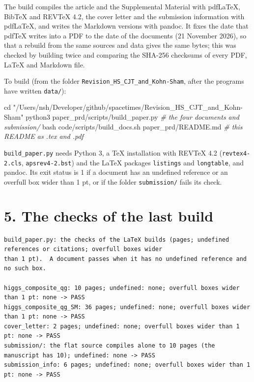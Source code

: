 \documentclass[
  10pt,
]{article}
\newenvironment{Shaded}{}{}
\newcommand{\BuiltInTok}[1]{\textcolor[rgb]{0.00,0.50,0.00}{#1}}
\newcommand{\CommentTok}[1]{\textcolor[rgb]{0.38,0.63,0.69}{\textit{#1}}}
\newcommand{\ExtensionTok}[1]{#1}
\newcommand{\FunctionTok}[1]{\textcolor[rgb]{0.02,0.16,0.49}{#1}}
\newcommand{\NormalTok}[1]{#1}
\newcommand{\StringTok}[1]{\textcolor[rgb]{0.25,0.44,0.63}{#1}}
\begin{document}
The build compiles the article and the Supplemental Material with
pdfLaTeX, BibTeX and REVTeX 4.2, the cover letter and the submission
information with pdfLaTeX, and writes the Markdown versions with pandoc.
It fixes the date that pdfTeX writes into a PDF to the date of the
documents (21 November 2026), so that a rebuild from the same sources
and data gives the same bytes; this was checked by building twice and
comparing the SHA-256 checksums of every PDF, LaTeX and Markdown file.

To build (from the folder \texttt{Revision\_HS\_CJT\_and\_Kohn-Sham},
after the programs have written \texttt{data/}):

\begin{Shaded}
\begin{Highlighting}[]
\BuiltInTok{cd} \StringTok{"/Users/nsh/Developer/github/spacetimes/Revision\_HS\_CJT\_and\_Kohn{-}Sham"}
\ExtensionTok{python3}\NormalTok{ paper\_prd/scripts/build\_paper.py             }\CommentTok{\# the four documents and submission/}
\FunctionTok{bash}\NormalTok{ code/scripts/build\_docs.sh paper\_prd/README.md  }\CommentTok{\# this README as .tex and .pdf}
\end{Highlighting}
\end{Shaded}

\texttt{build\_paper.py} needs Python 3, a TeX installation with REVTeX
4.2 (\texttt{revtex4-2.cls}, \texttt{apsrev4-2.bst}) and the LaTeX
packages \texttt{listings} and \texttt{longtable}, and pandoc. Its exit
status is 1 if a document has an undefined reference or an overfull box
wider than 1 pt, or if the folder \texttt{submission/} fails its check.

\hypertarget{the-checks-of-the-last-build}{%
\section{5. The checks of the last
build}\label{the-checks-of-the-last-build}}

\begin{verbatim}
build_paper.py: the checks of the LaTeX builds (pages; undefined references or citations; overfull boxes wider
than 1 pt).  A document passes when it has no undefined reference and no such box.

higgs_composite_qg: 10 pages; undefined: none; overfull boxes wider than 1 pt: none -> PASS
higgs_composite_qg_SM: 36 pages; undefined: none; overfull boxes wider than 1 pt: none -> PASS
cover_letter: 2 pages; undefined: none; overfull boxes wider than 1 pt: none -> PASS
submission/: the flat source compiles alone to 10 pages (the manuscript has 10); undefined: none -> PASS
submission_info: 6 pages; undefined: none; overfull boxes wider than 1 pt: none -> PASS
\end{verbatim}
\end{document}
